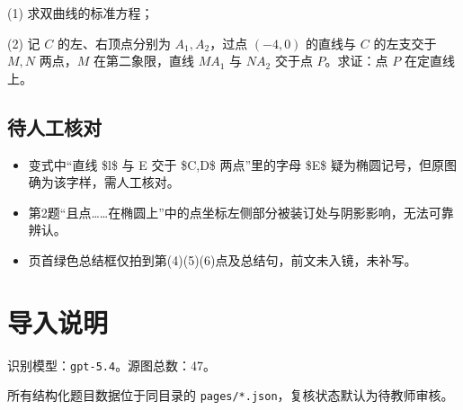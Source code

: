 \documentclass[UTF8,a4paper,11pt]{ctexart}
\begin{document}
(1) 求双曲线的标准方程；

(2) 记 $C$ 的左、右顶点分别为 $A_1,A_2$，过点 $(-4,0)$ 的直线与 $C$ 的左支交于 $M,N$ 两点，$M$ 在第二象限，直线 $MA_1$ 与 $NA_2$ 交于点 $P$。求证：点 $P$ 在定直线上。

\subsection*{待人工核对}

\begin{itemize}

\item 变式中“直线 \$l\$ 与 E 交于 \$C,D\$ 两点”里的字母 \$E\$ 疑为椭圆记号，但原图确为该字样，需人工核对。

\item 第2题“且点……在椭圆上”中的点坐标左侧部分被装订处与阴影影响，无法可靠辨认。

\item 页首绿色总结框仅拍到第(4)(5)(6)点及总结句，前文未入镜，未补写。

\end{itemize}

\clearpage

\appendix

\section{导入说明}

识别模型：\texttt{gpt-5.4}。源图总数：47。

所有结构化题目数据位于同目录的 \texttt{pages/*.json}，复核状态默认为待教师审核。
\end{document}
